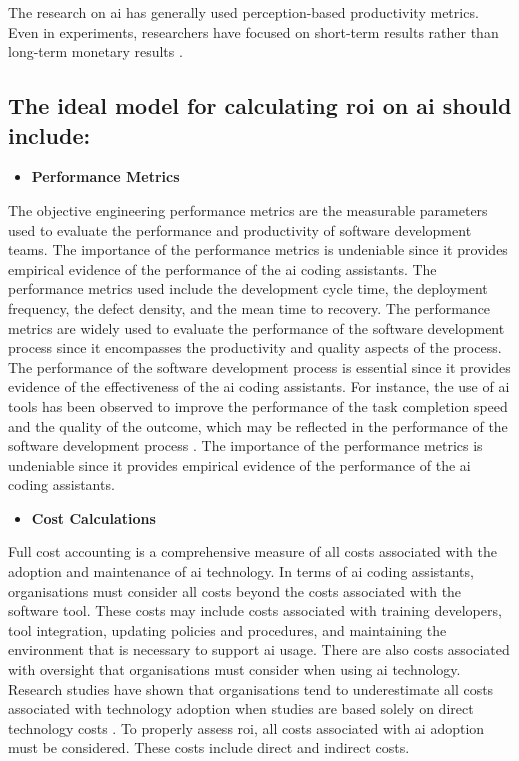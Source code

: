 The research on \gls{ai} has generally used perception-based productivity metrics. Even in experiments, researchers have focused on short-term results rather than long-term monetary results \autocite{Noy2023}. 

\subsection {The ideal model for calculating \gls{roi} on \gls{ai} should include: }
\label{sec:The ideal model for calculating ROI on AI should include}
\begin{itemize}
	\item \textbf{Performance Metrics} 
\end{itemize}
The objective engineering performance metrics are the measurable parameters used to evaluate the performance and productivity of software development teams. The importance of the performance metrics is undeniable since it provides empirical evidence of the performance of the \gls{ai} coding assistants. The performance metrics used include the development cycle time, the deployment frequency, the defect density, and the mean time to recovery. The performance metrics are widely used to evaluate the performance of the software development process since it encompasses the productivity and quality aspects of the process. The performance of the software development process is essential since it provides evidence of the effectiveness of the \gls{ai} coding assistants. For instance, the use of \gls{ai} tools has been observed to improve the performance of the task completion speed and the quality of the outcome, which may be reflected in the performance of the software development process \autocite{Noy2023}. The importance of the performance metrics is undeniable since it provides empirical evidence of the performance of the \gls{ai} coding assistants.

\begin{itemize}
	\item \textbf{Cost Calculations} 
\end{itemize}
Full cost accounting is a comprehensive measure of all costs associated with the adoption and maintenance of \gls{ai} technology. In terms of \gls{ai} coding assistants, organisations must consider all costs beyond the costs associated with the software tool. These costs may include costs associated with training developers, tool integration, updating policies and procedures, and maintaining the environment that is necessary to support \gls{ai} usage. There are also costs associated with oversight that organisations must consider when using \gls{ai} technology. Research studies have shown that organisations tend to underestimate all costs associated with technology adoption when studies are based solely on direct technology costs \autocite{Babina2024}. To properly assess \gls{roi}, all costs associated with \gls{ai} adoption must be considered. These costs include direct and indirect costs.

